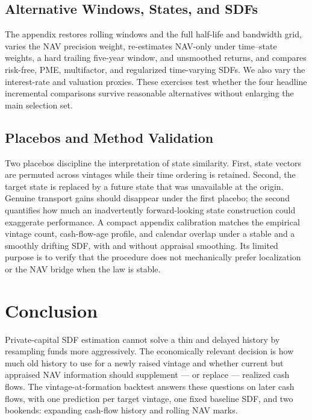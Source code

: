 \documentclass[11pt]{article}
\begin{document}
\subsection{Alternative Windows, States, and SDFs}

The appendix restores rolling windows and the full half-life and bandwidth
grid, varies the NAV precision weight, re-estimates NAV-only under time--state
weights, a hard trailing five-year window, and unsmoothed returns, and
compares risk-free, PME, multifactor, and regularized time-varying SDFs. We
also vary the interest-rate and valuation proxies. These exercises test
whether the four headline incremental comparisons survive reasonable
alternatives without enlarging the main selection set.

\subsection{Placebos and Method Validation}

Two placebos discipline the interpretation of state similarity. First, state
vectors are permuted across vintages while their time ordering is retained.
Second, the target state is replaced by a future state that was unavailable at
the origin. Genuine transport gains should disappear under the first placebo;
the second quantifies how much an inadvertently forward-looking state
construction could exaggerate performance. A compact appendix calibration
matches the empirical vintage count, cash-flow-age profile, and calendar
overlap under a stable and a smoothly drifting SDF, with and without appraisal
smoothing. Its limited purpose is to verify that the procedure does not
mechanically prefer localization or the NAV bridge when the law is stable.

\clearpage
\section{Conclusion}

Private-capital SDF estimation cannot solve a thin and delayed history by
resampling funds more aggressively. The economically relevant decision is how
much old history to use for a newly raised vintage and whether current but
appraised NAV information should supplement --- or replace --- realized cash
flows. The vintage-at-formation backtest answers these questions on later
cash flows, with one prediction per target vintage, one fixed baseline SDF,
and two bookends: expanding cash-flow history and rolling NAV marks.
\end{document}
